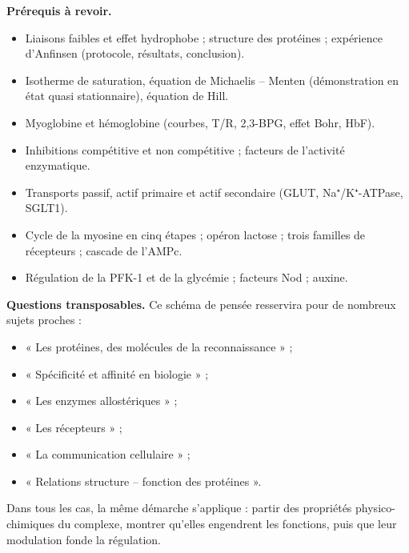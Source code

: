 \documentclass[11pt,a4paper]{article}
\providecommand{\tightlist}{\setlength{\itemsep}{0pt}\setlength{\parskip}{0pt}}
\begin{document}
\textbf{Prérequis à revoir.}

\begin{itemize}
\tightlist
\item
  Liaisons faibles et effet hydrophobe ; structure des protéines ; expérience d'Anfinsen (protocole, résultats, conclusion).
\item
  Isotherme de saturation, équation de Michaelis -- Menten (démonstration en état quasi stationnaire), équation de Hill.
\item
  Myoglobine et hémoglobine (courbes, T/R, 2,3-BPG, effet Bohr, HbF).
\item
  Inhibitions compétitive et non compétitive ; facteurs de l'activité enzymatique.
\item
  Transports passif, actif primaire et actif secondaire (GLUT, Na⁺/K⁺-ATPase, SGLT1).
\item
  Cycle de la myosine en cinq étapes ; opéron lactose ; trois familles de récepteurs ; cascade de l'AMPc.
\item
  Régulation de la PFK-1 et de la glycémie ; facteurs Nod ; auxine.
\end{itemize}

\textbf{Questions transposables.} Ce schéma de pensée resservira pour de nombreux sujets proches :

\begin{itemize}
\tightlist
\item
  « Les protéines, des molécules de la reconnaissance » ;
\item
  « Spécificité et affinité en biologie » ;
\item
  « Les enzymes allostériques » ;
\item
  « Les récepteurs » ;
\item
  « La communication cellulaire » ;
\item
  « Relations structure -- fonction des protéines ».
\end{itemize}

Dans tous les cas, la même démarche s'applique : partir des propriétés physico-chimiques du complexe, montrer qu'elles engendrent les fonctions, puis que leur modulation fonde la régulation.
\end{document}

